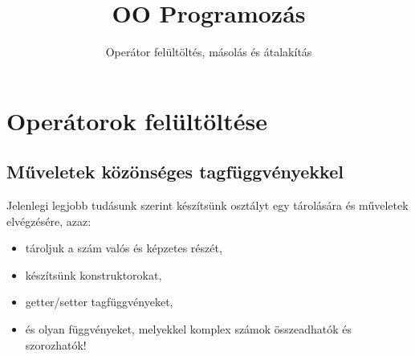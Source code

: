 \documentclass[usenames,dvipsnames,aspectratio=169]{beamer}
\title[OO Programozás - C++]{OO Programozás}
\subtitle{Operátor felültöltés, másolás és átalakítás}
\begin{document}
\begin{frame}[plain]
  \titlepage
  \logoalul
\end{frame}

\section{Operátorok felültöltése}

\subsection{Műveletek közönséges tagfüggvényekkel}

\begin{frame}
    Jelenlegi legjobb tudásunk szerint készítsünk osztályt egy  tárolására és műveletek elvégzésére, azaz:
    \begin{itemize}
        \item tároljuk a szám valós és képzetes részét, 
        \item készítsünk konstruktorokat,
        \item getter/setter tagfüggvényeket,
        \item és olyan függvényeket, melyekkel komplex számok összeadhatók és szorozhatók!
    \end{itemize}
\end{frame}

\begin{frame}
    \begin{exampleblock}{}
        \scriptsize
        
    \end{exampleblock}
\end{frame}

\begin{frame}
    \begin{exampleblock}{}
        \scriptsize
        
    \end{exampleblock}
\end{frame}

\begin{frame}
    \begin{exampleblock}{}
        
    \end{exampleblock}
\end{frame}
\end{document}
